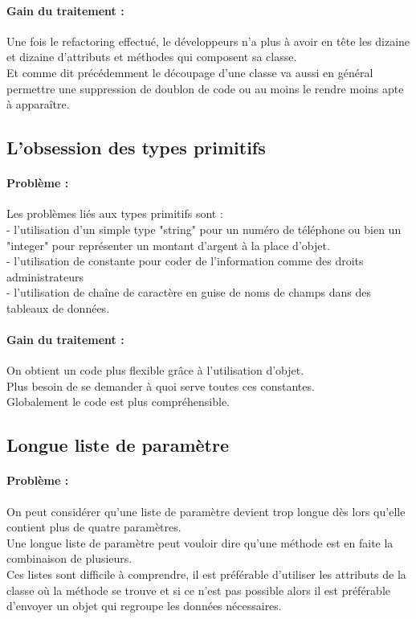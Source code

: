\documentclass[a4paper,twoside,12pt,openright]{report}
\begin{document}
\paragraph{Gain du traitement :}
Une fois le refactoring effectué, le développeurs n'a plus à avoir en tête les dizaine et dizaine d'attributs et méthodes qui composent sa classe.\\
Et comme dit précédemment le découpage d'une classe va aussi en général permettre une suppression de doublon de code ou au moins le rendre moins apte à apparaître.\\

\subsection{L'obsession des types primitifs}
\paragraph{Problème :}
Les problèmes liés aux types primitifs sont :\\
- l'utilisation d'un simple type "string" pour un numéro de téléphone ou bien un "integer" pour représenter un montant d'argent à la place d'objet.\\
- l'utilisation de constante pour coder de l'information comme des droits administrateurs\\
- l'utilisation de chaîne de caractère en guise de noms de champs dans des tableaux de données.\\

\paragraph{Gain du traitement :}
On obtient un code plus flexible grâce à l'utilisation d'objet.\\
Plus besoin de se demander à quoi serve toutes ces constantes.\\
Globalement le code est plus compréhensible.\\

\subsection{Longue liste de paramètre}
\paragraph{Problème :}
On peut considérer qu'une liste de paramètre devient trop longue dès lors qu'elle contient plus de quatre paramètres.\\
Une longue liste de paramètre peut vouloir dire qu'une méthode est en faite la combinaison de plusieurs.\\
Ces listes sont difficile à comprendre, il est préférable d'utiliser les attributs de la classe où la méthode se trouve et si ce n'est pas possible alors il est préférable d'envoyer un objet qui regroupe les données nécessaires.\\
\end{document}
